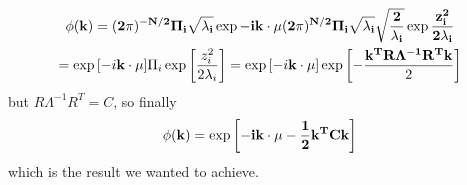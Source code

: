 \documentclass[a4paper,11pt,fleqn]{article}
\begin{document}
\begin{gather*}
    \phi(\bf{k}) = (2\pi)^{-N/2} \Pi_i\sqrt{\lambda_i} \exp{-i\bf{k}\cdot \bf{\mu}} (2\pi)^{N/2} \Pi_i \sqrt{\lambda_i} \sqrt{\frac{2}{\lambda_i}}\exp{\frac{z_i^2}{2\lambda_i}} \\
    = \exp{\left[-i\bf{k}\cdot \bf{\mu}\right]} \Pi_i \exp{\left[\frac{z_i^2}{2\lambda_i}\right]} = \exp{\left[-i\bf{k}\cdot \bf{\mu}\right]} \exp{\left[-\frac{\bf{k}^TR\Lambda^{-1} R^T\bf{k}}{2}\right]}
\end{gather*}
but $R \Lambda^{-1} R^T = C$, so finally 
\begin{gather*}
    \phi(\bf{k}) = \exp{\left[-i\bf{k}\cdot\bf{\mu}-\frac{1}{2}\bf{k}^TC\bf{k}\right]}
\end{gather*}
which is the result we wanted to achieve.
\end{document}
